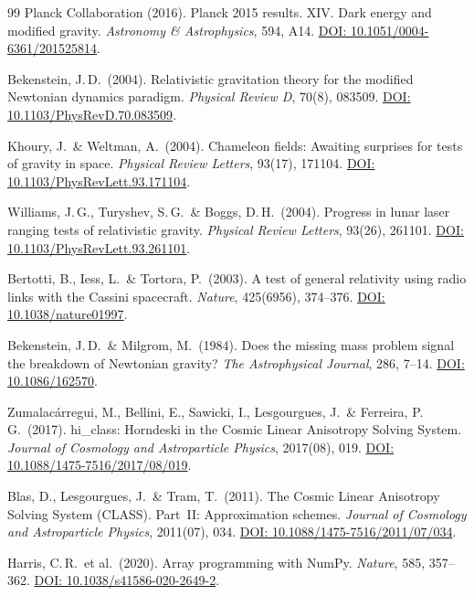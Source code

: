 \documentclass[aps,prd,twocolumn,superscriptaddress,nofootinbib]{revtex4-2}
\begin{document}
\begin{thebibliography}{99}
Planck Collaboration (2016).
Planck 2015 results. XIV. Dark energy and modified gravity.
\textit{Astronomy \& Astrophysics}, 594, A14.
\href{https://doi.org/10.1051/0004-6361/201525814}{DOI: 10.1051/0004-6361/201525814}.

Bekenstein, J.\,D.\ (2004).
Relativistic gravitation theory for the modified Newtonian dynamics paradigm.
\textit{Physical Review D}, 70(8), 083509.
\href{https://doi.org/10.1103/PhysRevD.70.083509}{DOI: 10.1103/PhysRevD.70.083509}.

Khoury, J.\ \& Weltman, A.\ (2004).
Chameleon fields: Awaiting surprises for tests of gravity in space.
\textit{Physical Review Letters}, 93(17), 171104.
\href{https://doi.org/10.1103/PhysRevLett.93.171104}{DOI: 10.1103/PhysRevLett.93.171104}.

Williams, J.\,G., Turyshev, S.\,G.\ \& Boggs, D.\,H.\ (2004).
Progress in lunar laser ranging tests of relativistic gravity.
\textit{Physical Review Letters}, 93(26), 261101.
\href{https://doi.org/10.1103/PhysRevLett.93.261101}{DOI: 10.1103/PhysRevLett.93.261101}.

Bertotti, B., Iess, L.\ \& Tortora, P.\ (2003).
A test of general relativity using radio links with the Cassini spacecraft.
\textit{Nature}, 425(6956), 374--376.
\href{https://doi.org/10.1038/nature01997}{DOI: 10.1038/nature01997}.

Bekenstein, J.\,D.\ \& Milgrom, M.\ (1984).
Does the missing mass problem signal the breakdown of Newtonian gravity?
\textit{The Astrophysical Journal}, 286, 7--14.
\href{https://doi.org/10.1086/162570}{DOI: 10.1086/162570}.

Zumalac\'arregui, M., Bellini, E., Sawicki, I., Lesgourgues, J.\ \& Ferreira, P.\,G.\ (2017).
hi\_class: Horndeski in the Cosmic Linear Anisotropy Solving System.
\textit{Journal of Cosmology and Astroparticle Physics}, 2017(08), 019.
\href{https://doi.org/10.1088/1475-7516/2017/08/019}{DOI: 10.1088/1475-7516/2017/08/019}.

Blas, D., Lesgourgues, J.\ \& Tram, T.\ (2011).
The Cosmic Linear Anisotropy Solving System (CLASS). Part~II: Approximation schemes.
\textit{Journal of Cosmology and Astroparticle Physics}, 2011(07), 034.
\href{https://doi.org/10.1088/1475-7516/2011/07/034}{DOI: 10.1088/1475-7516/2011/07/034}.

Harris, C.\,R.\ et al.\ (2020).
Array programming with NumPy.
\textit{Nature}, 585, 357--362.
\href{https://doi.org/10.1038/s41586-020-2649-2}{DOI: 10.1038/s41586-020-2649-2}.


\end{thebibliography}
\end{document}
